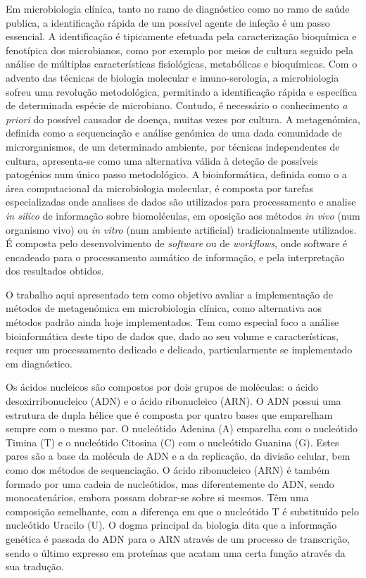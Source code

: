 Em microbiologia clínica, tanto no ramo de diagnóstico como no ramo de saúde publica, a identificação rápida de um possível agente de infeção é um passo essencial. A identificação é tipicamente efetuada pela caracterização bioquímica e fenotípica dos microbianos, como por exemplo por meios de cultura seguido pela análise de múltiplas características fisiológicas, metabólicas e bioquímicas. Com o advento das técnicas de biologia molecular e imuno-serologia, a microbiologia sofreu uma revolução metodológica, permitindo a identificação rápida e específica de determinada espécie de microbiano. Contudo, é necessário o conhecimento \textit{a priori} do possível causador de doença, muitas vezes por cultura. A metagenómica, definida como a sequenciação e análise genómica de uma dada comunidade de microrganismos, de um determinado ambiente, por técnicas independentes de cultura, apresenta-se como uma alternativa válida à deteção de possíveis patogénios num único passo metodológico. A bioinformática, definida como o a área computacional da microbiologia molecular, é composta por tarefas especializadas onde analises de dados são utilizados para processamento e analise \textit{in silico} de informação sobre biomoléculas, em oposição aos métodos \textit{in vivo} (num organismo vivo) ou \textit{in vitro} (num ambiente artificial) tradicionalmente utilizados. É composta pelo desenvolvimento de \textit{software} ou de \textit{workflows}, onde software é encadeado para o processamento aumático de informação, e pela interpretação dos resultados obtidos.

O trabalho aqui apresentado tem como objetivo avaliar a implementação de métodos de metagenómica em microbiologia clínica, como alternativa aos métodos padrão ainda hoje implementados. Tem como especial foco a análise bioinformática deste tipo de dados que, dado ao seu volume e características, requer um processamento dedicado e delicado, particularmente se implementado em diagnóstico. 

Os ácidos nucleicos são compostos por dois grupos de moléculas: o ácido desoxirribonucleico (ADN) e o ácido ribonucleico (ARN). O ADN possui uma estrutura de dupla hélice que é composta por quatro bases que emparelham sempre com o mesmo par. O nucleótido Adenina (A) emparelha com o nucleótido Timina (T) e o nucleótido Citosina (C) com o nucleótido Guanina (G). Estes pares são a base da molécula de ADN e a da replicação, da divisão celular, bem como dos métodos de sequenciação. O ácido ribonucleico (ARN) é também formado por uma cadeia de nucleótidos, mas diferentemente do ADN, sendo monocatenários, embora possam dobrar-se sobre si mesmos. Têm uma composição semelhante, com a diferença em que o nucleótido T é substituído pelo nucleótido Uracilo (U). O dogma principal da biologia dita que a informação genética é passada do ADN para o ARN através de um processo de transcrição, sendo o último expresso em proteínas que acatam uma certa função através da sua tradução. 

